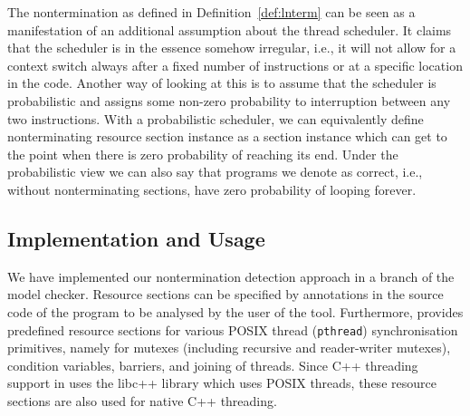 The nontermination as defined in Definition~\ref{def:lnterm} can be seen as a
manifestation of an additional assumption about the thread scheduler. It
claims that the scheduler is in the essence somehow irregular, i.e.,
it will not allow for a context switch always after a fixed number of
instructions or at a specific location in the code.  Another way of looking at
this is to assume that the scheduler is probabilistic and assigns some non-zero
probability to interruption between any two instructions. %
With a probabilistic scheduler, we can equivalently define nonterminating
resource section instance as a section instance which can get to the point when
there is zero probability of reaching its end.  Under the probabilistic view we can
also say that programs we denote as correct, i.e., without nonterminating
sections, have zero probability of looping forever.



\subsection{Implementation and Usage}

We have implemented our nontermination detection approach in a branch of the \divine model checker.
Resource sections can be specified by annotations in the source code
of the program to be analysed by the user of the tool.
Furthermore, \divine provides predefined resource sections for various POSIX
thread (\texttt{pthread}) synchronisation primitives, namely for
 mutexes (including recursive and reader-writer mutexes), %
 condition variables, barriers, and joining of threads.
Since C++ threading support in \divine uses the libc++ library which uses POSIX threads, these resource sections are also used for native C++ threading.

